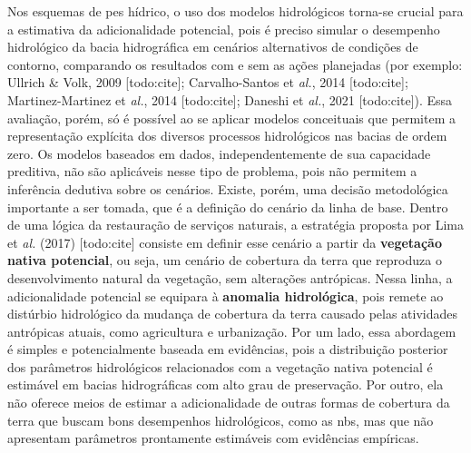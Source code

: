 \documentclass[./main.tex]{subfiles}
\begin{document}
\par Nos esquemas de \acrshort{pes} hídrico, o uso dos modelos hidrológicos torna-se crucial para a estimativa da adicionalidade potencial, pois é preciso simular o desempenho hidrológico da bacia hidrográfica em cenários alternativos de condições de contorno, comparando os resultados com e sem as ações planejadas (por exemplo: Ullrich \& Volk, 2009 [todo:cite]; Carvalho-Santos et \textit{al.}, 2014 [todo:cite]; Martinez-Martinez et \textit{al.}, 2014 [todo:cite]; Daneshi et \textit{al.}, 2021 [todo:cite]). Essa avaliação, porém, só é possível ao se aplicar modelos conceituais que permitem a representação explícita dos diversos processos hidrológicos nas bacias de ordem zero. Os modelos baseados em dados, independentemente de sua capacidade preditiva, não são aplicáveis nesse tipo de problema, pois não permitem a inferência dedutiva sobre os cenários. Existe, porém, uma decisão metodológica importante a ser tomada, que é a definição do cenário da linha de base. Dentro de uma lógica da restauração de serviços naturais, a estratégia proposta por Lima et \textit{al.} (2017) [todo:cite] consiste em definir esse cenário a partir da \textbf{vegetação nativa potencial}, ou seja, um cenário de cobertura da terra que reproduza o desenvolvimento natural da vegetação, sem alterações antrópicas. Nessa linha, a adicionalidade potencial se equipara à \textbf{anomalia hidrológica}, pois remete ao distúrbio hidrológico da mudança de cobertura da terra causado pelas atividades antrópicas atuais, como agricultura e urbanização. Por um lado, essa abordagem é simples e potencialmente baseada em evidências, pois a distribuição posterior dos parâmetros hidrológicos relacionados com a vegetação nativa potencial é estimável em bacias hidrográficas com alto grau de preservação. Por outro, ela não oferece meios de estimar a adicionalidade de outras formas de cobertura da terra que buscam bons desempenhos hidrológicos, como as \acrshort{nbs}, mas que não apresentam parâmetros prontamente estimáveis com evidências empíricas.   
\end{document}
